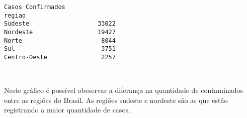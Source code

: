 \documentclass[11pt]{article}
\begin{document}
    \begin{Verbatim}[commandchars=\\\{\}]
              Casos Confirmados
regiao                         
Sudeste                   33022
Nordeste                  19427
Norte                      8044
Sul                        3751
Centro-Oeste               2257

    \end{Verbatim}

    \begin{center}
    \end{center}
    { \hspace*{\fill} \\}
    
    Neste gráfico é possível obeservar a diferança na quantidade de
contaminados entre as regiões do Brasil. As regiões sudeste e nordeste
são as que estão registrando a maior quantidade de casos.
\end{document}
